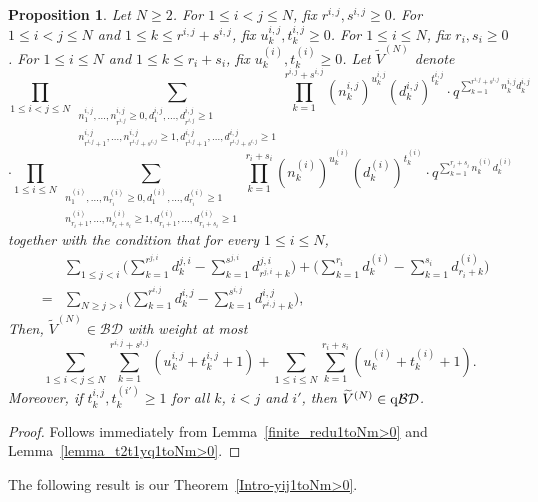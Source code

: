 \documentclass[12pt, reqno]{amsart}
\newtheorem{proposition}[theorem]{Proposition}
\theoremstyle{definition}
\theoremstyle{remark}
\numberwithin{equation}{section}
\newcommand{\BD}{\mathcal {BD}}
\newcommand{\qBD}{{\rm q}{\mathcal {BD}}}
\newcommand{\W}{\widetilde}
\numberwithin{equation}{section}
\begin{document}
\begin{proposition}  \label{Prop_t2t1yq1toNm>0} 
Let $N \ge 2$. For $1 \le i < j \le N$, fix $r^{i,j}, s^{i,j} \ge 0$. 
For $1 \le i < j \le N$ and $1 \le k \le r^{i,j} + s^{i,j}$, 
fix $u_k^{i,j}, t_k^{i,j} \ge 0$. 
For $1 \le i \le N$, fix $r_i, s_i \ge 0$. For $1 \le i \le N$
and $1 \le k \le r_i + s_i$, fix $u_k^{(i)}, t_k^{(i)} \ge 0$. 
Let $\W V^{(N)}$ denote
$$
\prod_{1 \le i < j \le N}
\sum_{\substack{n_1^{i,j}, \ldots, n_{r^{i,j}}^{i,j} \ge 0, 
    d_1^{i,j}, \ldots, d_{r^{i,j}}^{i,j} \ge 1\\
    n_{r^{i,j}+1}^{i,j}, \ldots, n_{r^{i,j}+s^{i,j}}^{i,j} \ge 1, 
    d_{r^{i,j}+1}^{i,j}, \ldots, d_{r^{i,j}+s^{i,j}}^{i,j} \ge 1}}
  \prod_{k=1}^{r^{i,j}+s^{i,j}} (n_k^{i,j})^{u_k^{i,j}}
    (d_k^{i,j})^{t_k^{i,j}} 
\cdot q^{\sum_{k=1}^{r^{i,j}+s^{i,j}} n_k^{i,j} d_k^{i,j}}
$$
$$
\cdot \prod_{1 \le i \le N}
\sum_{\substack{n_1^{(i)}, \ldots, n_{r_i}^{(i)} \ge 0, 
    d_1^{(i)}, \ldots, d_{r_i}^{(i)} \ge 1\\
    n_{r_i+1}^{(i)}, \ldots, n_{r_i+s_i}^{(i)} \ge 1,
    d_{r_i+1}^{(i)}, \ldots, d_{r_i+s_i}^{(i)} \ge 1}}
  \prod_{k=1}^{r_i+s_i} (n_k^{(i)})^{u_k^{(i)}} (d_k^{(i)})^{t_k^{(i)}}
\cdot q^{\sum_{k=1}^{r_i+s_i} n_k^{(i)} d_k^{(i)}}
$$
together with the condition that for every $1 \le i \le N$,
\begin{eqnarray*}
& &\sum_{1 \le j < i} \bigg (\sum_{k=1}^{r^{j,i}} d_k^{j,i} 
    - \sum_{k=1}^{s^{j,i}} d_{r^{j,i}+k}^{j,i} \bigg )
  + \bigg (\sum_{k=1}^{r_i} d_k^{(i)} 
    - \sum_{k=1}^{s_i} d_{r_i+k}^{(i)} \bigg )    \\
&=&\sum_{N \ge j > i} \bigg (\sum_{k=1}^{r^{i,j}} d_k^{i,j} 
    - \sum_{k=1}^{s^{i,j}} d_{r^{i,j}+k}^{i,j} \bigg ),
\end{eqnarray*}
Then, $\W V^{(N)} \in \BD$ with weight at most   
$$
\sum_{1 \le i < j \le N} \sum_{k=1}^{r^{i,j}+s^{i,j}} 
  (u_k^{i,j} + t_k^{i,j} + 1)
+ \sum_{1 \le i \le N} \sum_{k=1}^{r_i+s_i} (u_k^{(i)} +t_k^{(i)} +1).
$$
Moreover, if $t_k^{i,j}, t_k^{(i')} \ge 1$ for all $k$, $i < j$ and $i'$, 
then $\W V^{(N)} \in \qBD$. 
\end{proposition}
\begin{proof}
Follows immediately from Lemma~\ref{finite_redu1toNm>0} and 
Lemma~\ref{lemma_t2t1yq1toNm>0}.
\end{proof}

The following result is our Theorem~\ref{Intro-yij1toNm>0}.
\end{document}
